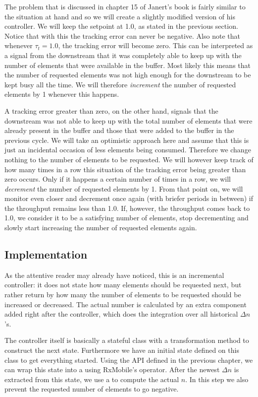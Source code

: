 The problem that is discussed in chapter 15 of Janert's book is fairly similar to the situation at hand and so we will create a slightly modified version of his controller. We will keep the setpoint at 1.0, as stated in the previous section. Notice that with this the tracking error can never be negative. Also note that whenever $\tau_t = 1.0$, the tracking error will become zero. This can be interpreted as a signal from the downstream that it was completely able to keep up with the number of elements that were available in the buffer. Most likely this means that the number of requested elements was not high enough for the downstream to be kept busy all the time. We will therefore \textit{increment} the number of requested elements by 1 whenever this happens.

A tracking error greater than zero, on the other hand, signals that the downstream was not able to keep up with the total number of elements that were already present in the buffer and those that were added to the buffer in the previous cycle. We will take an optimistic approach here and assume that this is just an incidental occasion of less elements being consumed. Therefore we change nothing to the number of elements to be requested. We will however keep track of how many times in a row this situation of the tracking error being greater than zero occurs. Only if it happens a certain number of times in a row, we will \textit{decrement} the number of requested elements by 1. From that point on, we will monitor even closer and decrement once again (with briefer periods in between) if the throughput remains less than 1.0. If, however, the throughput comes back to 1.0, we consider it to be a satisfying number of elements, stop decrementing and slowly start increasing the number of requested elements again.

\subsection*{Implementation}
As the attentive reader may already have noticed, this is an incremental controller: it does not state how many elements should be requested next, but rather return by how many the number of elements to be requested should be increased or decreased. The actual number is calculated by an extra component added right after the controller, which does the integration over all historical $\Delta n$'s.

The controller itself is basically a stateful class with a transformation method to construct the next state. Furthermore we have an initial state defined on this class to get everything started. Using the API defined in the previous chapter, we can wrap this state into a  using RxMobile's  operator. After the newest $\Delta n$ is extracted from this state, we use a  to compute the actual $n$. In this step we also prevent the requested number of elements to go negative.


